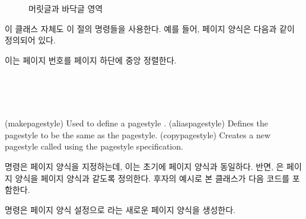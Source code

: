 \begin{figure}
\centering
\headerfooterdiagram
\caption{머릿글과 바닥글 영역}\label{lay:header}
\end{figure}

이 클래스 자체도 이 절의 명령들을 사용한다.
예를 들어,  페이지 양식은 다음과 같이 정의되어 있다.
\begin{lcode}
\end{lcode}
이는 페이지 번호를 페이지 하단에 중앙 정렬한다.


\begin{syntax}
\cmd{\makepagestyle} \\
\cmd{\aliaspagestyle} \\
\cmd{\copypagestyle}\\
\end{syntax}
\glossary(makepagestyle)%
  {}%
  {Used to define a pagestyle .}
\glossary(aliaspagestyle)%
  {}%
  {Defines the  pagestyle to be the same as the 
  pagestyle.}
\glossary(copypagestyle)%
  {}%
  {Creates a new pagestyle called  using the 
   pagestyle specification.}

\cmd{\makepagestyle} 명령은  페이지 양식을 지정하는데, 이는 초기에
 페이지 양식과 동일하다.
반면, \cmd{\aliaspagestyle}은  페이지 양식을  페이지
양식과 같도록 정의한다.
후자의 예시로 본 클래스가 다음 코드를 포함한다.
\begin{lcode}
\end{lcode}
\cmd{\copypagestyle} 명령은  페이지 양식 설정으로 라는
새로운 페이지 양식을 생성한다.

